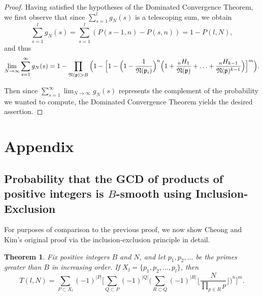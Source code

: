 \documentclass[12pt]{amsart}
\newtheorem{theorem}{Theorem}[subsection]
\theoremstyle{definition}
\newcommand{\f}[1]{\mathfrak{#1}}
\begin{document}
\begin{proof}
Having satisfied the hypotheses of the Dominated Convergence Theorem, we first observe that since $\sum_{s=1}^l g_N(s)$ is a telescoping sum, we obtain
$$\sum_{s=1}^l g_N(s) = \sum_{s=1}^l (P(s-1, n) - P(s, n)) = 1 - P(l, N),$$ 
and thus
$$\lim_{N \to \infty} \sum_{s=1}^{\infty} g_N(s) = 1 - \prod_{\f{N}(\f{p}) > B} \Big(1 - \Big[1 - \Big(1-\frac{1}{\f{N}(\f{p}_i)}\Big)^n \Big(1 + \frac{{}_nH_1}{\f{N}(\f{p})} + \mathellipsis + \frac{{}_nH_{k-1}}{\f{N}(\f{p})^{k-1}}\Big)\Big]^m\Big).$$

\noindent Then since $\displaystyle \sum_{s=1}^{\infty} \lim_{N \to \infty} g_N(s)$ represents the complement of the probability we wanted to compute, the Dominated Convergence Theorem yields the desired assertion.
\end{proof}

\section{Appendix}
\subsection{Probability that the GCD of products of positive integers is \texorpdfstring{$B$}{}-smooth using Inclusion-Exclusion}
For purposes of comparison to the previous proof, we now show Cheong and Kim's original proof via the inclusion-exclusion principle in detail.
\begin{theorem}
	Fix positive integers $B$ and $N$, and let $p_1, p_2, ...$ be the primes greater than $B$ in increasing order. If $X_l = \{p_1, p_2, ..., p_l\}$, then
	$$T(l,N)=\sum_{P\subset X_l}{(-1)^{|P|}} \Big[\sum_{Q\subset P}(-1)^{|Q|} \Big(\sum_{R\subset Q}(-1)^{|R|}\Big\lfloor\frac{N}{\prod_{p\in R} p}\Big\rfloor\Big)^n\Big]^m.$$
\end{theorem}
\end{document}
